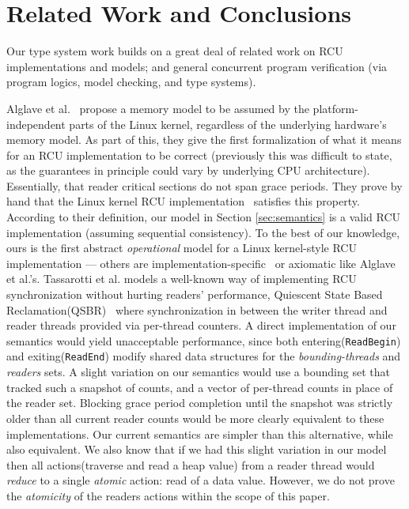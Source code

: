 \section{Related Work and Conclusions}
\label{sec:relatedwork}
Our type system work builds on a great deal of related work on RCU implementations and models; and general concurrent program verification (via program logics, model checking, and type systems).

Alglave et al.~\cite{Alglave:2018:FSC:3173162.3177156} propose a memory model to be assumed by the platform-independent parts of the Linux kernel, regardless of the underlying hardware's memory model.
As part of this, they give the first formalization of what it means for an RCU implementation to be correct (previously this was difficult to state, as the guarantees in principle could vary by underlying CPU architecture). Essentially, that reader critical sections do not span grace periods.  They prove by hand that the Linux kernel RCU implementation~\cite{DBLP:conf/cav/AlglaveKT13,abssem} satisfies this property. 
According to their definition, our model in Section \ref{sec:semantics} is a valid RCU implementation (assuming sequential consistency).
To the best of our knowledge, ours is the first abstract \emph{operational} model for a Linux kernel-style RCU implementation --- others are implementation-specific~\cite{Mandrykin:2016:TDV:3001219.3001297} or axiomatic like Alglave et al.'s. 
Tassarotti et al. models a well-known way of implementing RCU synchronization without hurting readers' performance, \textsf{Quiescent State Based Reclamation}(QSBR)~\cite{urcu_ieee} where synchronization in between the writer thread and reader threads provided via per-thread counters. A direct implementation of our semantics would yield unacceptable performance, since both entering(\lstinline|ReadBegin|) and exiting(\lstinline|ReadEnd|) modify shared data structures for the \textit{bounding-threads} and \textit{readers} sets. A slight variation on our semantics would use a bounding set  that tracked such a snapshot of counts, and a vector of per-thread counts in place of the reader set. Blocking grace period completion until the snapshot was strictly older than all current reader counts would be more clearly equivalent to these implementations. Our current semantics are simpler than this alternative, while also equivalent. We also know that if we had this slight variation in our model then all actions(traverse and read a heap value) from a reader thread would \textit{reduce} to a single \textit{atomic} action: read of a data value. However, we do not prove the \textit{atomicity} of the readers actions within the scope of this paper.

